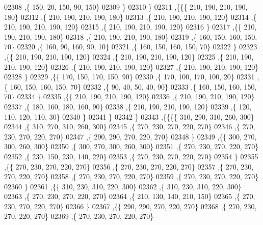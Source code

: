 \begin{DoxyCode}
02308     ,\{   150,    20,   150,    90,   150\}
02309     \}
02310    \}
02311   ,\{\{\{   210,   190,   210,   190,   180\}
02312     ,\{   210,   190,   210,   190,   180\}
02313     ,\{   210,   190,   210,   190,   120\}
02314     ,\{   210,   190,   210,   190,   120\}
02315     ,\{   210,   190,   210,   190,   120\}
02316     \}
02317    ,\{\{   210,   190,   210,   190,   180\}
02318     ,\{   210,   190,   210,   190,   180\}
02319     ,\{   160,   150,   160,   150,    70\}
02320     ,\{   160,    90,   160,    90,    10\}
02321     ,\{   160,   150,   160,   150,    70\}
02322     \}
02323    ,\{\{   210,   190,   210,   190,   120\}
02324     ,\{   210,   190,   210,   190,   120\}
02325     ,\{   210,   190,   210,   190,   120\}
02326     ,\{   210,   190,   210,   190,   120\}
02327     ,\{   210,   190,   210,   190,   120\}
02328     \}
02329    ,\{\{   170,   150,   170,   150,    90\}
02330     ,\{   170,   100,   170,   100,    20\}
02331     ,\{   160,   150,   160,   150,    70\}
02332     ,\{    90,    40,    50,    40,    90\}
02333     ,\{   160,   150,   160,   150,    70\}
02334     \}
02335    ,\{\{   210,   190,   210,   190,   120\}
02336     ,\{   210,   190,   210,   190,   120\}
02337     ,\{   180,   160,   180,   160,    90\}
02338     ,\{   210,   190,   210,   190,   120\}
02339     ,\{   120,   110,   120,   110,    30\}
02340     \}
02341    \}
02342   \}
02343  ,\{\{\{\{   310,   290,   310,   260,   300\}
02344     ,\{   310,   270,   310,   260,   300\}
02345     ,\{   270,   230,   270,   220,   270\}
02346     ,\{   270,   230,   270,   220,   270\}
02347     ,\{   290,   290,   270,   220,   270\}
02348     \}
02349    ,\{\{   300,   270,   300,   260,   300\}
02350     ,\{   300,   270,   300,   260,   300\}
02351     ,\{   270,   230,   270,   220,   270\}
02352     ,\{   230,   150,   230,   140,   220\}
02353     ,\{   270,   230,   270,   220,   270\}
02354     \}
02355    ,\{\{   270,   230,   270,   220,   270\}
02356     ,\{   270,   230,   270,   220,   270\}
02357     ,\{   270,   230,   270,   220,   270\}
02358     ,\{   270,   230,   270,   220,   270\}
02359     ,\{   270,   230,   270,   220,   270\}
02360     \}
02361    ,\{\{   310,   230,   310,   220,   300\}
02362     ,\{   310,   230,   310,   220,   300\}
02363     ,\{   270,   230,   270,   220,   270\}
02364     ,\{   210,   130,   140,   210,   150\}
02365     ,\{   270,   230,   270,   220,   270\}
02366     \}
02367    ,\{\{   290,   290,   270,   220,   270\}
02368     ,\{   270,   230,   270,   220,   270\}
02369     ,\{   270,   230,   270,   220,   270\}

\end{DoxyCode}
